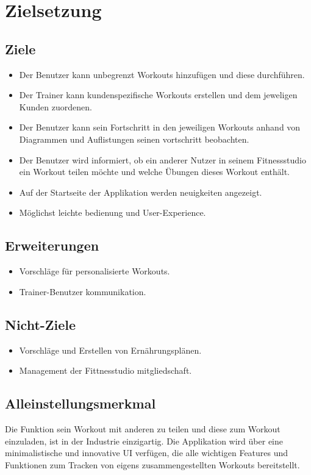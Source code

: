 \documentclass[12pt]{article}
\theoremstyle{definition}
\begin{document}
\pagebreak

\section{Zielsetzung}

\subsection{Ziele}
\begin{itemize}
\item Der Benutzer kann unbegrenzt Workouts hinzufügen und diese durchführen.
\item Der Trainer kann kundenspezifische Workouts erstellen und dem jeweligen Kunden zuordenen.
\item Der Benutzer kann sein Fortschritt in den jeweiligen Workouts anhand von Diagrammen und Auflistungen seinen vortschritt beobachten.
\item Der Benutzer wird informiert, ob ein anderer Nutzer in seinem Fitnessstudio ein Workout teilen möchte und welche Übungen dieses Workout enthält.
\item Auf der Startseite der Applikation werden neuigkeiten angezeigt.
\item Möglichst leichte bedienung und User-Experience.
\end{itemize}
\subsection{Erweiterungen}
\begin{itemize}
\item Vorschläge für personalisierte Workouts.
\item Trainer-Benutzer kommunikation.
\end{itemize}

\subsection{Nicht-Ziele}
\begin{itemize}
\item Vorschläge und Erstellen von Ernährungsplänen.
\item Management der Fittnesstudio mitgliedschaft.
\end{itemize}

\subsection{Alleinstellungsmerkmal}
Die Funktion sein Workout mit anderen zu teilen und diese zum Workout einzuladen, 
ist in der Industrie einzigartig. Die Applikation wird über eine minimalistische und innovative UI verfügen, 
die alle wichtigen Features und Funktionen zum Tracken von eigens zusammengestellten Workouts bereitstellt.
\end{document}
